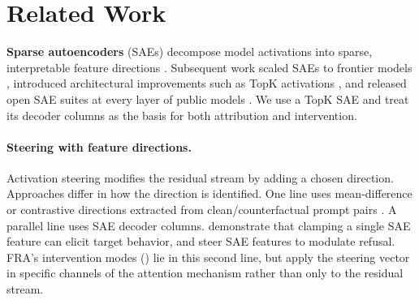 \documentclass{article}
\theoremstyle{plain}
\theoremstyle{definition}
\theoremstyle{remark}
\begin{document}



\section{Related Work}
\label{sec:related}

\textbf{Sparse autoencoders} (SAEs) decompose model activations into sparse, interpretable feature directions \citep{cunningham2023sparse,bricken2023monosemanticity}. Subsequent work scaled SAEs to frontier models \citep{templeton2024scaling}, introduced architectural improvements such as TopK activations \citep{gao2024scalingevaluatingsparseautoencoders}, and released open SAE suites at every layer of public models \citep{lieberum2024gemma}. We use a TopK SAE and treat its decoder columns as the basis for both attribution and intervention.

\paragraph{Steering with feature directions.} Activation steering modifies the residual stream by adding a chosen direction. Approaches differ in how the direction is identified. One line uses mean-difference or contrastive directions extracted from clean/counterfactual prompt pairs \citep{turner2023activation,panickssery2023steering}. A parallel line uses SAE decoder columns. \citet{templeton2024scaling} demonstrate that clamping a single SAE feature can elicit target behavior, and \citet{obrien2024steering} steer SAE features to modulate refusal. FRA's intervention modes () lie in this second line, but apply the steering vector in specific channels of the attention mechanism rather than only to the residual stream.
\end{document}
